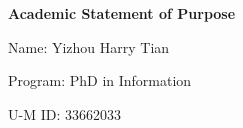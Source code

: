 \noindent \textbf{Academic Statement of Purpose}

\noindent Name: Yizhou Harry Tian 

\noindent Program: PhD in Information 

\noindent U-M ID: 33662033


